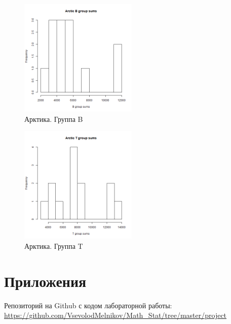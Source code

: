 \begin{figure}[!htb]
    \centering
    \includegraphics[width=0.5\textwidth]{fig/Arctic_B.png}
    \caption{Арктика. Группа B}
\end{figure}
\newpage
\begin{figure}[!htb]
    \centering
    \includegraphics[width=0.5\textwidth]{fig/Arctic_T.png}
    \caption{Арктика. Группа T}
\end{figure}


\section{Приложения}
Репозиторий на Github с кодом лабораторной работы:\\
\url{https://github.com/VsevolodMelnikov/Math_Stat/tree/master/project}

